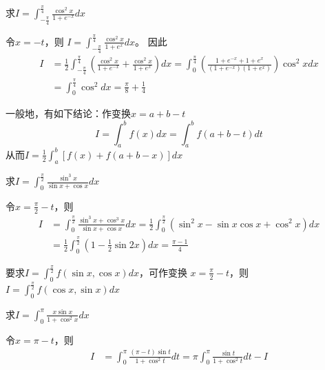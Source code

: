 \documentclass{article}
\begin{document}
\begin{examplle}[]
求\(I=\displaystyle\int_{-\frac{\pi}{4}}^{\frac{\pi}{4}}\frac{\cos^2x}{1+e^{-x}}dx\)

令\(x=-t\)，则
\(I=\displaystyle\int_{-\frac{\pi}{4}}^{\frac{\pi}{4}}\frac{\cos^2x}{1+e^{x}}dx\)。
因此
\begin{align*}
I&=\frac{1}{2}\int_{-\frac{\pi}{4}}^{\frac{\pi}{4}}
\left(\frac{\cos^2x}{1+e^{-x}}+\frac{\cos^2x}{1+e^{x}}
\right)dx=
\int^{\frac{\pi}{4}}_0
\left(\frac{1+e^{-x}+1+e^x}{(1+e^{-x})(1+e^x)}
\right)\cos^2xdx\\
&=\int^{\frac{\pi}{4}}_0\cos^2dx=\frac{\pi}{8}+\frac{1}{4}
\end{align*}
\end{examplle}

\begin{remark}
一般地，有如下结论：作变换\(x=a+b-t\)
\begin{equation*}
I=\int^b_af(x)dx=\int^b_af(a+b-t)dt
\end{equation*}
从而\(I=\frac{1}{2}\int^b_a[f(x)+f(a+b-x)]dx\)
\end{remark}

\begin{examplle}[]
求\(I=\displaystyle\int_0^{\frac{\pi}{2}}\frac{\sin^3x}{\sin x+\cos x}dx\)

令\(x=\frac{\pi}{2}-t\)，则
\begin{align*}
I&=\int_0^{\frac{\pi}{2}}\frac{\sin^3x+\cos^3x}{\sin x+\cos x}dx=
\frac{1}{2}\int_0^{\frac{\pi}{2}}(\sin^2x-\sin x\cos x+\cos^2x)dx\\
&=\frac{1}{2}\int_0^{\frac{\pi}{2}}(1-\frac{1}{2}\sin 2x)dx=\frac{\pi-1}{4}
\end{align*}
\end{examplle}

\begin{remark}
要求\(I=\displaystyle\int^{\frac{\pi}{2}}_0f(\sin x,\cos x)dx\)，可作变换
\(x=\frac{\pi}{2}-t\)，则\(I=\displaystyle\int^{\frac{\pi}{2}}_0f(\cos x,\sin x)dx\)
\end{remark}

\begin{examplle}[]
求\(I=\int^\pi_0\frac{x\sin x}{1+\cos^2x}dx\)

令\(x=\pi-t\)，则
\begin{align*}
I&=\int^\pi_0\frac{(\pi-t)\sin t}{1+\cos^2t}dt=
\pi\int^\pi_0\frac{\sin t}{1+\cos^2t}dt-I
\end{align*}
\end{examplle}
\end{document}
